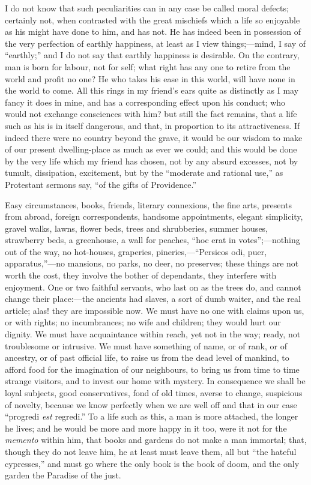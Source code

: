 I do not know that such peculiarities can in any case be called
moral defects; certainly not, when contrasted with the great mischiefs
which a life so enjoyable as his might have done to him, and has not.
He has indeed been in possession of the very perfection of earthly
happiness, at least as I view things;—mind, I say of
``earthly;'' and I do not say that earthly happiness is
desirable. On the contrary, man is born for labour, not for self; what
right has any one to retire from the world and profit no one? He who
takes his ease in this world, will have none in the world to come. All
this rings in my friend's ears quite as distinctly as I may fancy it
does in mine, and has a corresponding effect upon his conduct; who
would not exchange consciences with him? but still the fact remains,
that a life such as his is in itself dangerous, and that, in
proportion to its attractiveness. If indeed there were no country
beyond the grave, it would be our wisdom to make of our present
dwelling-place as much as ever we could; and this would be done by the
very life which my friend has chosen, not by any absurd excesses, not
by tumult, dissipation, excitement, but by the ``moderate and
rational use,'' as Protestant sermons say, ``of the gifts of
Providence.''

Easy circumstances, books, friends, literary connexions, the fine
arts, presents from abroad, foreign correspondents, handsome
appointments, elegant simplicity, gravel walks, lawns, flower beds,
trees and shrubberies, summer houses, strawberry beds, a greenhouse, a
wall for peaches, ``hoc erat in votes'';—nothing out of the
way, no hot-houses, graperies, pineries,—``Persicos odi, puer,
apparatus,''—no mansions, no parks, no deer, no preserves; these
things are not worth the cost, they involve the bother of dependants,
they interfere with enjoyment. One or two faithful servants, who last
on as the trees do, and cannot change their place:—the ancients had
slaves, a sort of dumb waiter, and the real article; alas! they are
impossible now. We must have no one with claims upon us, or with
rights; no incumbrances; no wife and children; they would hurt our
dignity. We must have acquaintance within reach, yet not in the way;
ready, not troublesome or intrusive. We must have something of name,
or of rank, or of ancestry, or of past official life, to raise us from
the dead level of mankind, to afford food for the imagination of our
neighbours, to bring us from time to time strange visitors, and to
invest our home with mystery. In consequence we shall be loyal
subjects, good conservatives, fond of old times, averse to change,
suspicious of novelty, because we know perfectly when we are well off
and that in our case ``progredi \emph{est} regredi.'' To a
life such as this, a man is more attached, the longer he lives; and he would be more and more happy in it too, were it not for the \emph{memento} within him, that books and gardens do not make a man immortal;
that, though they do not leave him, he at least must leave them, all
but ``the hateful cypresses,'' and must go where the only book
is the book of doom, and the only garden the Paradise of the just.

